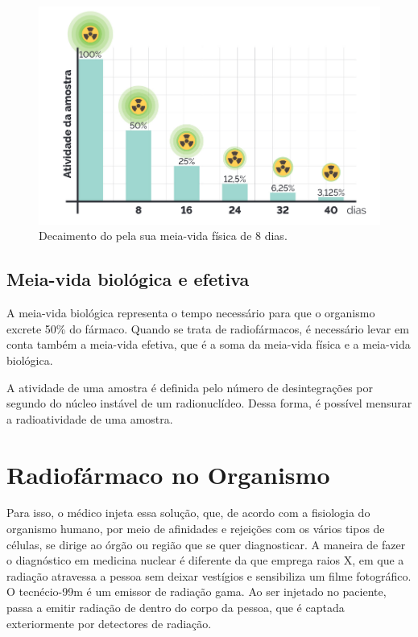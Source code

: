 \documentclass[11pt]{article}
\begin{document}
\begin{multicols}{2}
\begin{figure}[H]
\centering
\includegraphics[scale=0.22]{./../QM/meia-vida.png}
\caption{\label{meiavida}Decaimento do    pela sua meia-vida física de 8 dias.}
\end{figure}

\subsection{Meia-vida biológica e efetiva}
\label{sec:orgcdc5a52}

A meia-vida biológica representa o tempo necessário para que o organismo excrete 50\% do fármaco. Quando se trata de radiofármacos, é necessário levar em conta também a meia-vida efetiva, que é a soma da meia-vida física e a meia-vida biológica.

A atividade de uma amostra é definida pelo número de desintegrações por segundo do núcleo instável de um radionuclídeo. Dessa forma, é possível mensurar a radioatividade de uma amostra. 

\section{Radiofármaco no Organismo}
\label{sec:orgba007fc}

Para isso, o médico injeta essa solução, que, de acordo com a fisiologia do organismo humano, por meio de afinidades e rejeições com os vários tipos de células, se dirige ao órgão ou região que se quer diagnosticar. A maneira de fazer o diagnóstico em medicina nuclear é diferente da que emprega raios X, em que a radiação atravessa a pessoa sem deixar vestígios e sensibiliza um filme fotográfico. O tecnécio-99m é um emissor de radiação gama. Ao ser injetado no paciente, passa a emitir radiação de dentro do corpo da pessoa, que é captada exteriormente por detectores de radiação.


\end{multicols}
\end{document}
